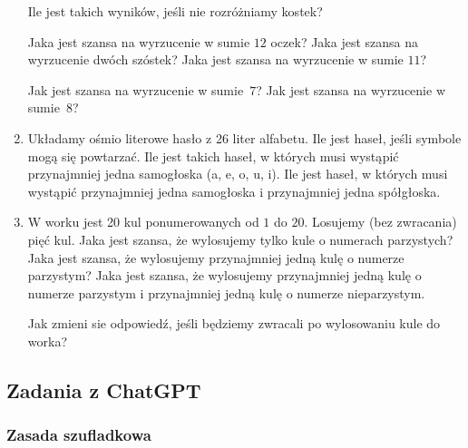 \documentclass[12pt]{article}
\begin{document}
\begin{enumerate}
    Ile jest takich wyników, jeśli nie rozróżniamy kostek?
    
    Jaka jest szansa na wyrzucenie w sumie $12$ oczek? Jaka jest 
    szansa na wyrzucenie dwóch szóstek?
    Jaka jest szansa na wyrzucenie w sumie $11$?
    
    Jak jest szansa na wyrzucenie w sumie~$7$?
    Jak jest szansa na wyrzucenie w sumie~$8$?
    
    \item 
    Układamy ośmio literowe hasło z 26 liter alfabetu. Ile jest haseł, jeśli symbole mogą 
    się powtarzać. Ile jest takich haseł, w których musi wystąpić przynajmniej jedna 
    samogłoska (a, e, o, u, i). Ile jest haseł, w których musi wystąpić przynajmniej 
    jedna samogłoska i przynajmniej jedna spółgłoska.
    
    \item 
    W worku jest 20 kul ponumerowanych od $1$ do $20$. Losujemy (bez zwracania) pięć kul.
    Jaka jest szansa, że wylosujemy tylko kule o numerach parzystych?
    Jaka jest szansa, że wylosujemy przynajmniej jedną kulę o numerze parzystym?
    Jaka jest szansa, że wylosujemy przynajmniej jedną kulę o numerze parzystym
    i przynajmniej jedną kulę o numerze nieparzystym.

   Jak zmieni sie odpowiedź, jeśli będziemy zwracali po wylosowaniu kule do worka?
   

\end{enumerate}


\subsection{Zadania z ChatGPT}

\subsubsection{Zasada szufladkowa}
\end{document}
